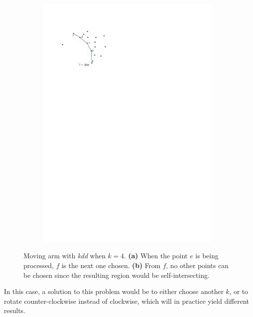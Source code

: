 \begin{figure}
\begin{subfigure}[b]{0.3\linewidth}
    \includegraphics[page=5,width=\textwidth]{figs/movingarm.pdf}
    \caption{}
  \end{subfigure}
\caption{Moving arm with \emph{kdd} when $k=4$. \textbf{(a)} When the point $e$ is being processed, $f$ is the next one chosen. \textbf{(b)} From $f$, no other points can be chosen since the resulting region would be self-intersecting.}
\label{fig:movingarm_kdd}
\end{figure}
In this case, a solution to this problem would be to either choose another $k$, or to rotate counter-clockwise instead of clockwise, which will in practice yield different results.


%
